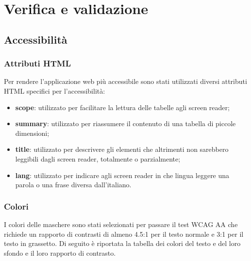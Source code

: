 
\chapter{Verifica e validazione}
\label{cap:verifica-validazione}

\section{Accessibilità}
\subsection{Attributi HTML}

Per rendere l'applicazione web più accessibile sono stati utilizzati diversi attributi HTML specifici per l'accessibilità:
\begin{itemize}
    \item \textbf{scope}: utilizzato per facilitare la lettura delle tabelle agli screen reader;
    \item \textbf{summary}: utilizzato per riassumere il contenuto di una tabella di piccole dimensioni;
    \item \textbf{title}: utilizzato per descrivere gli elementi che altrimenti non sarebbero leggibili dagli screen reader, totalmente o parzialmente;
    \item \textbf{lang}: utilizzato per indicare agli screen reader in che lingua leggere una parola o una frase diversa dall'italiano.
\end{itemize}


\subsection{Colori}
I colori delle maschere sono stati selezionati per passare il test WCAG AA che richiede un rapporto di contrasti di almeno 4.5:1 per il testo normale e 3:1 per il testo in grassetto. Di seguito è riportata la tabella dei colori del testo e del loro sfondo e il loro rapporto di contrasto.

